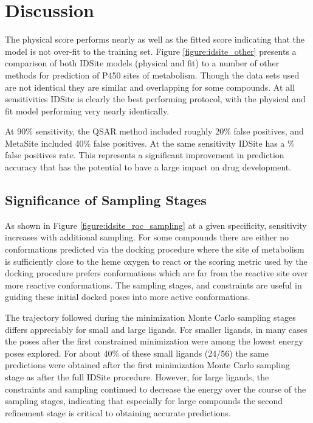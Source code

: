 \section{Discussion}
\label{section:p450/discussion}
The physical score performs nearly as well as the fitted score indicating that the model is not over-fit to the training set.
Figure \ref{figure:idsite_other} presents a comparison of both IDSite models (physical and fit) to a number of other methods for prediction of P450 sites of metabolism.
Though the data sets used are not identical they are similar and overlapping for some compounds.
At all sensitivities IDSite is clearly the best performing protocol, with the physical and fit model performing very nearly identically.

At 90\% sensitivity, the QSAR method included roughly 20\% false positives, and MetaSite included 40\% false positives.
At the same sensitivity IDSite has a \% false positives rate.
This represents a significant improvement in prediction accuracy that has the potential to have a large impact on drug development.

\subsection{Significance of Sampling Stages}
\label{subsection:p450/discussion/sampling_stages}

As shown in Figure \ref{figure:idsite_roc_sampling} at a given specificity, sensitivity increases with additional sampling.
For some compounds there are either no conformations predicted via the docking procedure where the site of metabolism is sufficiently close to the heme oxygen to react or the scoring metric used by the docking procedure prefers conformations which are far from the reactive site over more reactive conformations.
The sampling stages, and constraints are useful in guiding these initial docked poses into more active conformations.

The trajectory followed during the minimization Monte Carlo sampling stages differs appreciably for small and large ligands.
For smaller ligands, in many cases the poses after the first constrained minimization were among the lowest energy poses explored.
For about 40\% of these small ligands (24/56) the same predictions were obtained after the first minimization Monte Carlo sampling stage as after the full IDSite procedure.
However, for large ligands, the constraints and sampling continued to decrease the energy over the course of the sampling stages, indicating that especially for large compounds the second refinement stage is critical to obtaining accurate predictions.

